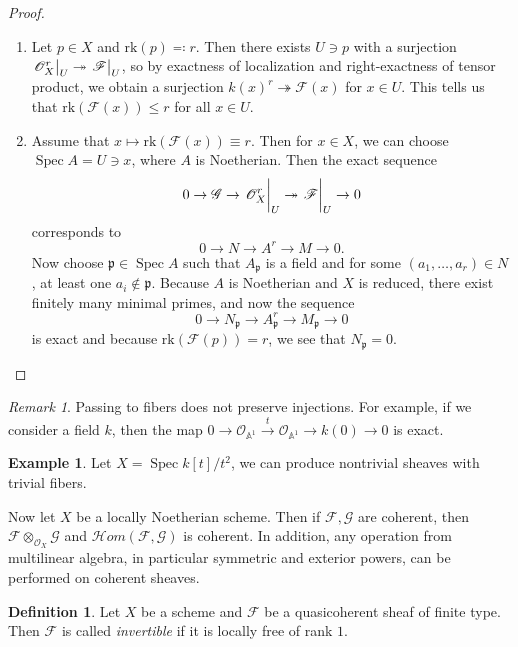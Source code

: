\documentclass[leqno, openany]{memoir}
\theoremstyle{definition}
\newtheorem{defn}[thm]{Definition}
\newtheorem{exm}[thm]{Example}
\theoremstyle{remark}
\newtheorem{rmk}[thm]{Remark}
\theoremstyle{plain}
\theoremstyle{definition}
\theoremstyle{remark}
\newcommand{\A}{\mathbb{A}}
\newcommand{\mf}[1]{\mathfrak{#1}}
\newcommand{\mr}[1]{\mathrm{#1}}
\newcommand{\msc}[1]{\mathscr{#1}}
\DeclareMathOperator{\Spec}{Spec}
\begin{document}
\begin{proof}\leavevmode
    \begin{enumerate}
        \item Let $p \in X$ and $\mr{rk}(p) \eqqcolon r$. Then there exists $U \ni p$ with a surjection $\eval{\msc{O}_X^r}_U \twoheadrightarrow \eval{\msc{F}}_U$, so by exactness of localization and right-exactness of tensor product, we obtain a surjection ${k(x)}^r \twoheadrightarrow \msc{F}(x)$ for $x \in U$. This tells us that $\mr{rk}(\msc{F}(x)) \leq r$ for all $x \in U$.
        \item Assume that $x \mapsto \mr{rk}(\msc{F}(x)) \equiv r$. Then for $x \in X$, we can choose $\Spec A = U \ni x$, where $A$ is Noetherian. Then the exact sequence
            \[ 0 \to \msc{G} \to \eval{\msc{O}_X^r}_U \twoheadrightarrow \eval{\msc{F}}_U \to 0 \]
            corresponds to
            \[ 0 \to N \to A^r \to M \to 0. \]
            Now choose $\mf{p} \in \Spec A$ such that $A_{\mf{p}}$ is a field and for some $(a_1, \ldots, a_r) \in N$, at least one $a_i \notin \mf{p}$. Because $A$ is Noetherian and $X$ is reduced, there exist finitely many minimal primes, and now the sequence
            \[ 0 \to N_{\mf{p}} \to A_{\mf{p}}^r \to M_{\mf{p}} \to 0 \]
            is exact and because $\mr{rk}(\msc{F}(p)) = r$, we see that $N_{\mf{p}} = 0$. \qedhere
    \end{enumerate}
\end{proof}

\begin{rmk}
    Passing to fibers does not preserve injections. For example, if we consider a field $k$, then the map $0 \to \msc{O}_{\A^1} \xrightarrow{t} \msc{O}_{\A^1} \to k(0) \to 0$ is exact.
\end{rmk}

\begin{exm}
    Let $X = \Spec k[t] / t^2$, we can produce nontrivial sheaves with trivial fibers.
\end{exm}

Now let $X$ be a locally Noetherian scheme. Then if $\msc{F}, \msc{G}$ are coherent, then $\msc{F} \otimes_{\msc{O}_X} \msc{G}$ and $\msc{H}om(\msc{F}, \msc{G})$ is coherent. In addition, any operation from multilinear algebra, in particular symmetric and exterior powers, can be performed on coherent sheaves.

\begin{defn}
    Let $X$ be a scheme and $\msc{F}$ be a quasicoherent sheaf of finite type. Then $\msc{F}$ is called \textit{invertible} if it is locally free of rank $1$.
\end{defn}
\end{document}
